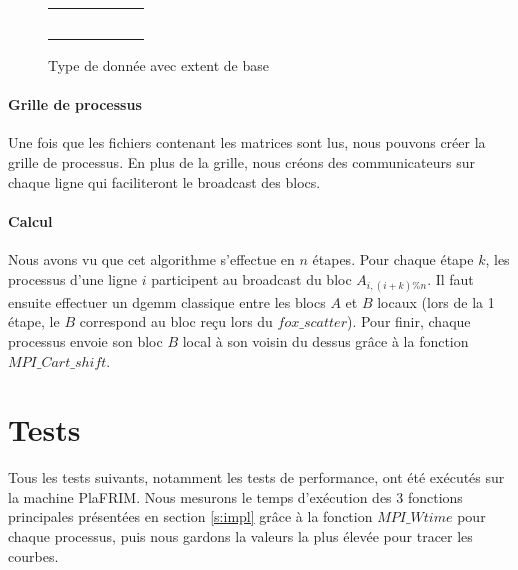 \documentclass[12pt]{article}
\begin{document}
\begin{figure}[ht]
  \centering
  \begin{tabular}{|c|c|c||c|c|c|}
    \hline
    \cellcolor{green}& \cellcolor{green} & \cellcolor{green} & & & \\ 
    \hline
    \cellcolor{green}& \cellcolor{green} & \cellcolor{green} & & & \\
    \hline
    \cellcolor{green}& \cellcolor{green} & \cellcolor{green} & & & \\ 
    \hline
    \hline
    \cellcolor{gray}& \cellcolor{gray} & & & & \\ 
    \hline
    \cellcolor{gray}& \cellcolor{gray} & & & & \\
    \hline
    \cellcolor{gray}& \cellcolor{gray} & & & & \\ 
    \hline
  \end{tabular}
  \caption{\label{fig:datatype} Type de donnée avec extent de base}
\end{figure}


\paragraph{Grille de processus}
Une fois que les fichiers contenant les matrices sont lus, nous pouvons créer la grille de processus. En plus de la grille, nous créons des communicateurs sur chaque ligne qui faciliteront le broadcast des blocs.

\paragraph{Calcul}
Nous avons vu que cet algorithme s'effectue en $n$ étapes. Pour chaque étape $k$, les processus d'une ligne $i$ participent au broadcast du bloc $A_{i,(i+k)\%n}$. Il faut ensuite effectuer un dgemm classique entre les blocs $A$ et $B$ locaux (lors de la 1\iere{} étape, le $B$ correspond au bloc reçu lors du $fox\_scatter$). Pour finir, chaque processus envoie son bloc $B$ local à son voisin du dessus grâce à la fonction $MPI\_Cart\_shift$.

\section{Tests}
Tous les tests suivants, notamment les tests de performance, ont été exécutés sur la machine PlaFRIM. Nous mesurons le temps d'exécution des 3 fonctions principales présentées en section \ref{s:impl} grâce à la fonction $MPI\_Wtime$ pour chaque processus, puis nous gardons la valeurs la plus élevée pour tracer les courbes.
\end{document}
